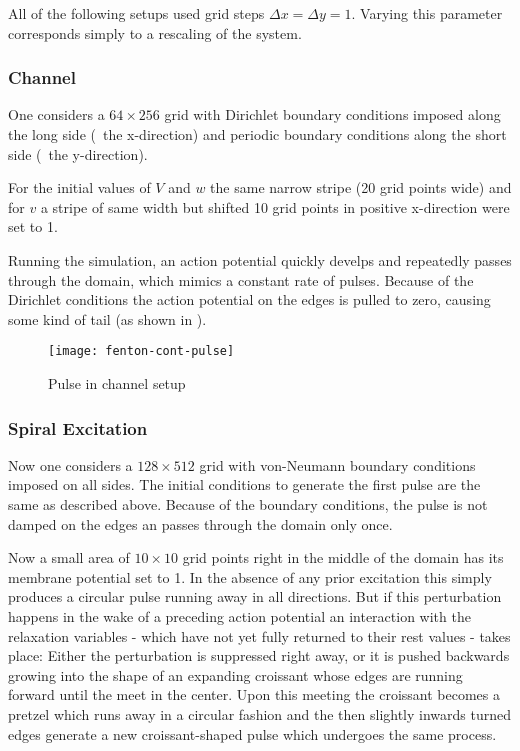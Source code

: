 All of the following setups used grid steps $\Delta{x}=\Delta{y}=1$. Varying
this parameter corresponds simply to a rescaling of the system.


\subsubsection{Channel}
One considers a $64\times256$ grid with Dirichlet boundary conditions imposed
along the long side (\ie~the x-direction) and periodic boundary conditions
along the short side (\ie~the y-direction).

For the initial values of $V$ and $w$ the same narrow stripe (20 grid points
wide) and for $v$ a stripe of same width but shifted 10 grid points in positive
x-direction were set to 1.

Running the simulation, an action potential quickly develps and repeatedly
passes through the domain, which mimics a constant rate of pulses. Because of
the Dirichlet conditions the action potential on the edges is pulled to zero,
causing some kind of tail (as shown in ).

\begin{figure}[h]
    \centering
    \texttt{[image: fenton-cont-pulse]}
    \label{fig:pulse}
    \caption{Pulse in channel setup}
\end{figure}


\subsubsection{Spiral Excitation}
Now one considers a $128\times512$ grid with von-Neumann boundary conditions
imposed on all sides. The initial conditions to generate the first pulse are
the same as described above. Because of the boundary conditions, the pulse is
not damped on the edges an passes through the domain only once.

Now a small area of $10\times10$ grid points right in the middle of the domain
has its membrane potential set to 1. In the absence of any prior excitation
this simply produces a circular pulse running away in all directions. But if
this perturbation happens in the wake of a preceding action potential an
interaction with the relaxation variables - which have not yet fully returned
to their rest values - takes place: Either the perturbation is suppressed right
away, or it is pushed backwards growing into the shape of an expanding
croissant whose edges are running forward until the meet in the
center. Upon this meeting the croissant becomes a pretzel which runs away in a
circular fashion and the then slightly inwards turned edges generate a new
croissant-shaped pulse which undergoes the same process.

